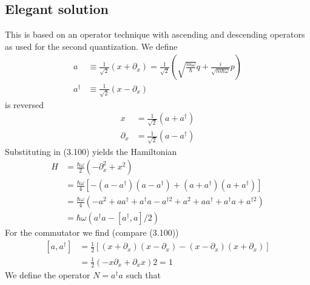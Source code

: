 \subsection{Elegant solution}
This is based on an operator technique with ascending and descending operators as used for the second quantization. We define
\begin{equation}
\begin{aligned} a & \equiv \frac{1}{\sqrt{2}}\left(x+\partial_{x}\right)=\frac{1}{\sqrt{2}}\left(\sqrt{\frac{m \omega}{\hbar}} q+\frac{i}{\sqrt{m \hbar \omega}} p\right) \\ a^{\dagger} & \equiv \frac{1}{\sqrt{2}}\left(x-\partial_{x}\right) \end{aligned}
\end{equation}
is reversed
\begin{equation}
\begin{aligned} x &=\frac{1}{\sqrt{2}}\left(a+a^{\dagger}\right) \\ \partial_{x} &=\frac{1}{\sqrt{2}}\left(a-a^{\dagger}\right) \end{aligned}
\end{equation}
Substituting in (3.100) yields the Hamiltonian
\begin{equation}
\begin{aligned} H &=\frac{\hbar \omega}{2}\left(-\partial_{x}^{2}+x^{2}\right) \\ &=\frac{\hbar \omega}{4}\left[-\left(a-a^{\dagger}\right)\left(a-a^{\dagger}\right)+\left(a+a^{\dagger}\right)\left(a+a^{\dagger}\right)\right] \\ &=\frac{\hbar \omega}{4}\left(-a^{2}+a a^{\dagger}+a^{\dagger} a-a^{\dagger 2}+a^{2}+a a^{\dagger}+a^{\dagger} a+a^{\dagger 2}\right) \\ &=\hbar \omega\left(a^{\dagger} a-\left[a^{\dagger}, a\right] / 2\right) \end{aligned}
\end{equation}
For the commutator we find (compare (3.100))
\begin{equation}
\begin{aligned}\left[a, a^{\dagger}\right] &=\frac{1}{2}\left[\left(x+\partial_{x}\right)\left(x-\partial_{x}\right)-\left(x-\partial_{x}\right)\left(x+\partial_{x}\right)\right] \\ &=\frac{1}{2}\left(-x \partial_{x}+\partial_{x} x\right) 2=1 \end{aligned}
\end{equation}
We define the operator $N = a^{\dagger} a$ such that
